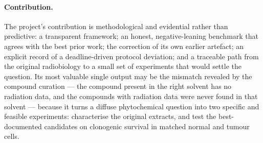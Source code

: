 \paragraph{Contribution.} The project's contribution is methodological and evidential rather
than predictive: a transparent framework; an honest, negative-leaning benchmark that agrees
with the best prior work; the correction of its own earlier artefact; an explicit record of a
deadline-driven protocol deviation; and a traceable path from the original radiobiology to a
small set of experiments that would settle the question. Its most valuable single output may
be the mismatch revealed by the compound curation --- the compound present in the right
solvent has no radiation data, and the compounds with radiation data were never found in that
solvent --- because it turns a diffuse phytochemical question into two specific and feasible
experiments: characterise the original extracts, and test the best-documented candidates on
clonogenic survival in matched normal and tumour cells.
